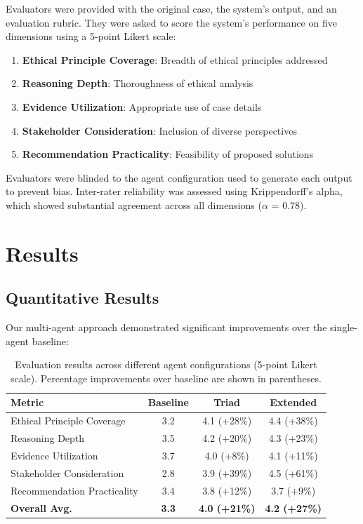 \documentclass[11pt]{article}
\begin{document}
Evaluators were provided with the original case, the system's output, and an evaluation rubric. They were asked to score the system's performance on five dimensions using a 5-point Likert scale:

\begin{enumerate}
    \item \textbf{Ethical Principle Coverage}: Breadth of ethical principles addressed
    \item \textbf{Reasoning Depth}: Thoroughness of ethical analysis
    \item \textbf{Evidence Utilization}: Appropriate use of case details
    \item \textbf{Stakeholder Consideration}: Inclusion of diverse perspectives
    \item \textbf{Recommendation Practicality}: Feasibility of proposed solutions
\end{enumerate}

Evaluators were blinded to the agent configuration used to generate each output to prevent bias. Inter-rater reliability was assessed using Krippendorff's alpha, which showed substantial agreement across all dimensions ($\alpha$ = 0.78).

\section{Results}

\subsection{Quantitative Results}

Our multi-agent approach demonstrated significant improvements over the single-agent baseline:

\begin{table}[htbp]
\centering
\scriptsize
\setlength{\tabcolsep}{2pt}
\begin{tabular}{@{}lccc@{}}
\toprule
\textbf{Metric} & \textbf{Baseline} & \textbf{Triad} & \textbf{Extended} \\
\midrule
Ethical Principle Coverage & 3.2 & 4.1 (+28\%) & 4.4 (+38\%) \\
Reasoning Depth & 3.5 & 4.2 (+20\%) & 4.3 (+23\%) \\
Evidence Utilization & 3.7 & 4.0 (+8\%) & 4.1 (+11\%) \\
Stakeholder Consideration & 2.8 & 3.9 (+39\%) & 4.5 (+61\%) \\
Recommendation Practicality & 3.4 & 3.8 (+12\%) & 3.7 (+9\%) \\
\midrule
\textbf{Overall Avg.} & \textbf{3.3} & \textbf{4.0 (+21\%)} & \textbf{4.2 (+27\%)} \\
\bottomrule
\end{tabular}
\caption{Evaluation results across different agent configurations (5-point Likert scale). Percentage improvements over baseline are shown in parentheses.}
\label{tab:results}
\end{table}
\end{document}
